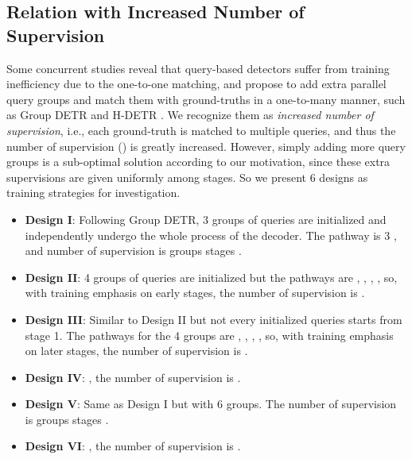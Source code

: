 \documentclass[10pt,twocolumn,letterpaper]{article}
\begin{document}
\subsection{Relation with Increased Number of Supervision}






Some concurrent studies reveal that query-based detectors suffer from training inefficiency due to the one-to-one matching, and propose to add extra parallel query groups and match them with ground-truths in a one-to-many manner, such as Group DETR \cite{Chen2022GroupDF} and H-DETR \cite{Jia2022DETRsWH}. We recognize them as \emph{increased number of supervision}, i.e., each ground-truth is matched to multiple queries, and thus the number of supervision () is greatly increased. However, simply adding more query groups is a sub-optimal solution according to our motivation, since these extra supervisions are given uniformly among stages. So we present 6 designs as training strategies for investigation.

\begin{itemize}
    \item \textbf{Design I}: Following Group DETR, 3 groups of queries are initialized and independently undergo the whole process of the decoder. The pathway is 3  , and number of supervision is  groups  stages .
    \item \textbf{Design II}: 4 groups of queries are initialized but the pathways are
    , 
    , 
    , 
    , so, with training emphasis on early stages, the number of supervision is .
    \item \textbf{Design III}: Similar to Design II but not every initialized queries starts from stage 1. The pathways for the 4 groups are ,
    , 
    ,
    , so, with training emphasis on later stages, the number of supervision is .
    \item \textbf{Design IV}: , the number of supervision is .
    \item \textbf{Design V}: Same as Design I but with 6 groups. The number of supervision is  groups  stages .
    \item \textbf{Design VI}: , the number of supervision is .
\end{itemize}
\end{document}
